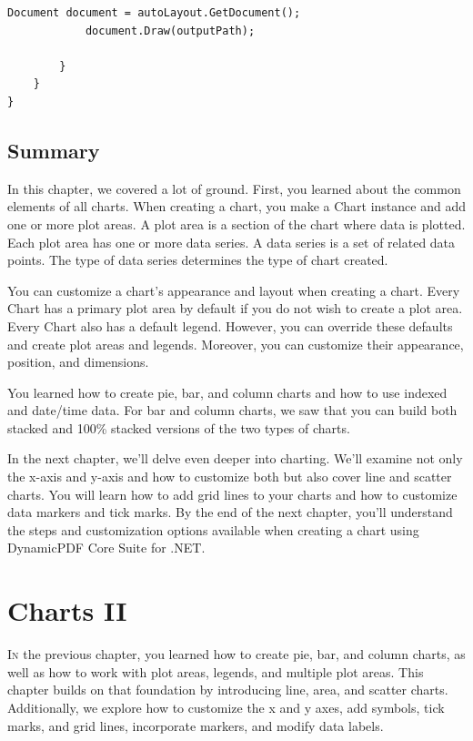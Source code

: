 \documentclass[american]{tufte-book}
\numberwithin{equation}{section}
\numberwithin{figure}{section}
\def\color#1{}%
\begin{document}
{\begin{lstlisting}[caption={Using AutoLayout to create a PDF document.},label={lis:autolayout-chart},basicstyle={\footnotesize\ttfamily},breaklines=true]
            Document document = autoLayout.GetDocument();
            document.Draw(outputPath);

        }
    }
}
\end{lstlisting}
\leavevmode\egroup


\section{Summary}

In this chapter, we covered a lot of ground. First, you learned about
the common elements of all charts. When creating a chart, you make
a Chart instance and add one or more plot areas. A plot area is a
section of the chart where data is plotted. Each plot area has one
or more data series. A data series is a set of related data points.
The type of data series determines the type of chart created. 

You can customize a chart's appearance and layout when creating a
chart. Every Chart has a primary plot area by default if you do not
wish to create a plot area. Every Chart also has a default legend.
However, you can override these defaults and create plot areas and
legends. Moreover, you can customize their appearance, position, and
dimensions. 

You learned how to create pie, bar, and column charts and how to use
indexed and date/time data. For bar and column charts, we saw that
you can build both stacked and 100\% stacked versions of the two types
of charts.

In the next chapter, we'll delve even deeper into charting. We'll
examine not only the x-axis and y-axis and how to customize both but
also cover line and scatter charts. You will learn how to add grid
lines to your charts and how to customize data markers and tick marks.
By the end of the next chapter, you'll understand the steps and customization
options available when creating a chart using DynamicPDF Core
Suite for .NET.

\color{white}
\chapter{Charts II}\label{chap:Charts-II}
\color{black}
\BgThispage
\vspace{8.00em}
\lettrine[lines=2,lhang=0.1]{I}{n} the previous chapter, you learned how to create pie, bar, and column charts, as well as how to work with plot areas, legends, and multiple plot areas. This chapter builds on that foundation by introducing line, area, and scatter charts. Additionally, we explore how to customize the x and y axes, add symbols, tick marks, and grid lines, incorporate markers, and modify data labels.

}
\end{document}
